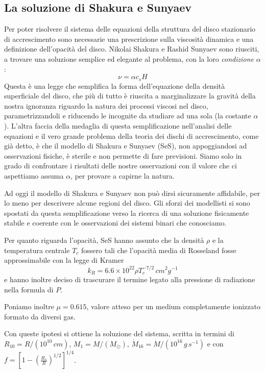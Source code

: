 \documentclass[a4paperbi]{article}
\begin{document}
\subsection{La soluzione di Shakura e Sunyaev}
	Per poter risolvere il sistema delle equazioni della struttura del disco stazionario di accrescimento sono necessarie una prescrizione sulla viscosità dinamica e una definizione dell'opacità del disco. Nikolai Shakura e Rashid Sunyaev sono riusciti, a trovare una soluzione semplice ed elegante al problema, con la loro \textit{condizione} $\alpha$:
	\begin{equation}
		\nu=\alpha c_sH
	\end{equation}
Questa è una legge che semplifica la forma dell'equazione della densità superficiale del disco, che più di tutto è riuscita a marginalizzare la gravità della nostra ignoranza riguardo la natura dei processi viscosi nel disco, parametrizzandoli e riducendo le incognite da studiare ad una sola (la costante $\alpha$). L'altra faccia della medaglia di questa semplificazione nell'analisi delle equazioni e il vero grande problema della teoria dei dischi di accrescimento, come già detto, è che il modello di Shakura e Sunyaev (SeS), non appoggiandosi ad osservazioni fisiche, è sterile e non permette di fare previsioni. Siamo solo in grado di confrontare i risultati delle nostre osservazioni con il valore che ci aspettiamo assuma $\alpha$, per provare a capirne la natura.

Ad oggi il modello di Shakura e Sunyaev non può dirsi sicuramente affidabile, per lo meno per descrivere alcune regioni del disco. Gli sforzi dei modellisti si sono spostati da questa semplificazione verso la ricerca di una soluzione fisicamente stabile e coerente con le osservazioni dei sistemi binari che conosciamo.

Per quanto riguarda l'opacità, SeS hanno assunto che la densità $\rho$ e la temperatura centrale $T_c$ fossero tali che l'opacità media di Rosseland fosse approssimabile con la legge di Kramer
\begin{equation}
	k_R=6.6\times10^{22}\rho T_c^{-7/2}\,cm^2g^{-1}
\end{equation}
e hanno inoltre deciso di trascurare il termine legato alla pressione di radiazione nella formula di $P$.

Poniamo inoltre $\mu=0.615$, valore atteso per un medium completamente ionizzato formato da diversi gas. 

Con queste ipotesi si ottiene la soluzione del sistema, scritta in termini di $R_{10}=R/(10^{10}\,cm)$, $M_{1}=M/(M_\odot)$, $\dot{M}_{16}=\dot{M}/(10^{16}\,g\,s^{-1})$ e con $f=\left[1-\left(\frac{R_*}{R}\right)^{1/2}\right]^{1/4}$. 
\end{document}
